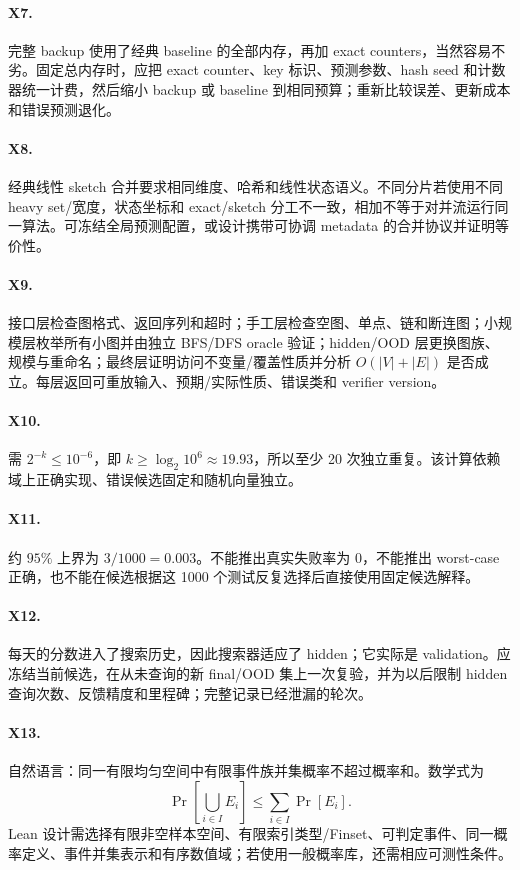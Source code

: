 \paragraph{X7.}
完整 backup 使用了经典 baseline 的全部内存，再加 exact counters，当然容易不劣。固定总内存时，应把 exact counter、key 标识、预测参数、hash seed 和计数器统一计费，然后缩小 backup 或 baseline 到相同预算；重新比较误差、更新成本和错误预测退化。

\paragraph{X8.}
经典线性 sketch 合并要求相同维度、哈希和线性状态语义。不同分片若使用不同 heavy set/宽度，状态坐标和 exact/sketch 分工不一致，相加不等于对并流运行同一算法。可冻结全局预测配置，或设计携带可协调 metadata 的合并协议并证明等价性。

\paragraph{X9.}
接口层检查图格式、返回序列和超时；手工层检查空图、单点、链和断连图；小规模层枚举所有小图并由独立 BFS/DFS oracle 验证；hidden/OOD 层更换图族、规模与重命名；最终层证明访问不变量/覆盖性质并分析 $O(|V|+|E|)$ 是否成立。每层返回可重放输入、预期/实际性质、错误类和 verifier version。

\paragraph{X10.}
需 $2^{-k}\le10^{-6}$，即 $k\ge\log_2 10^6\approx19.93$，所以至少 20 次独立重复。该计算依赖域上正确实现、错误候选固定和随机向量独立。

\paragraph{X11.}
约 $95\%$ 上界为 $3/1000=0.003$。不能推出真实失败率为 0，不能推出 worst-case 正确，也不能在候选根据这 1000 个测试反复选择后直接使用固定候选解释。

\paragraph{X12.}
每天的分数进入了搜索历史，因此搜索器适应了 hidden；它实际是 validation。应冻结当前候选，在从未查询的新 final/OOD 集上一次复验，并为以后限制 hidden 查询次数、反馈精度和里程碑；完整记录已经泄漏的轮次。

\paragraph{X13.}
自然语言：同一有限均匀空间中有限事件族并集概率不超过概率和。数学式为
\[
\Pr[\bigcup_{i\in I}E_i]\le\sum_{i\in I}\Pr[E_i].
\]
Lean 设计需选择有限非空样本空间、有限索引类型/Finset、可判定事件、同一概率定义、事件并集表示和有序数值域；若使用一般概率库，还需相应可测性条件。

